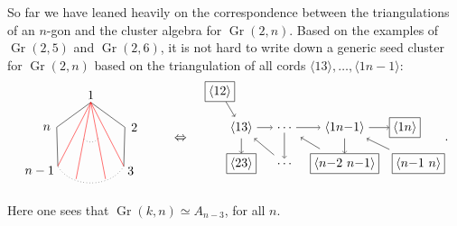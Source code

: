 \documentclass[11pt]{article}
\DeclareMathOperator{\Gr}{Gr}
\def\ket#1{\langle #1 \rangle}
\begin{document}
So far we have leaned heavily on the correspondence between the triangulations of an $n$-gon and the cluster algebra for $\Gr(2,n)$. Based on the examples of $\Gr(2,5)$ and $\Gr(2,6)$, it is not hard to write down a generic seed cluster for $\Gr(2,n)$ based on the triangulation of all cords $\ket{13},\ldots,\ket{1n{-}1}$:
\begin{equation}\label{eq:g2n-seed}
\begin{gathered}
\begin{tikzpicture}
	\coordinate (P1) at (90:1);
	\coordinate (P2) at (18:1);
	\coordinate (P3) at (320:1.2);
	\coordinate (P4) at (220:1.2);
	\coordinate (P5) at (162:1);
	\draw (0,1.2) node {1};
	\draw (1,.3) node[anchor=west] {2};
	\draw (.9,-.9) node[anchor=west] {3};
	\draw (-.9,-.9) node[anchor=east] {$n-1$};
	\draw (-1,.3) node[anchor=east] {$n$};
	\draw (P1) -- (P2) -- (P3);
	\draw[dotted] (P3) to[out=240,in=300] (P4);
	\draw (P4) -- (P5) -- (P1);
	\draw[red] (P1) -- (P3);
	\draw[red] (P1) -- (P4);
	\draw[red] (P1) -- (290:1.2);
	\draw[red] (P1) -- (250:1.2);
	\draw[dotted] (.2,0) to[out=240,in=300] (-.2,0);
	\draw (2.5,0) node {$\Leftrightarrow$};
	\begin{scope}[xshift = .2cm, yshift = .3cm]
	\def \xSep {1.2}
	\def \xInit {4}
    \node (13) at (\xInit,0) {$\ket{13}$};
    \node (14) at (\xInit+\xSep,0) {$\ldots$};
    \node (15) at (\xInit+2.4*\xSep,0) {$\ket{1n{-}1}$};
	\node[draw, inner sep=1mm] (12) at (\xInit-.5*\xSep,1) {$\ket{12}$};
    \node[draw, inner sep=1mm] (16) at (\xInit+3.8*\xSep,0) {$\ket{1n}$};
    \node[draw, inner sep=1mm,anchor=west] (56) at (\xInit+3.5*\xSep,-1) {$\ket{n{-}1~n}$};
    \node[draw, inner sep=1mm] (45) at (\xInit+2.4*\xSep,-1) {$\ket{n{-}2~n{-}1}$};
    \node (34) at (\xInit+\xSep,-1) {$\ldots$};
    \node[draw, inner sep=1mm] (23) at (\xInit,-1) {$\ket{23}$};
    \draw[->] (12) -- (13);
    \draw[->] (13) -- (14);
    \draw[->] (14) -- (15);
    \draw[->] (15) -- (16);
    \draw[->] (13) -- (23);
    \draw[->, shorten <= 0.15cm] (34) -- (13);
    \draw[->] (14) -- (34);
    \draw[->, shorten <= 0.25cm, shorten >= 0.25cm] (45) -- (14);
    \draw[->] (15) -- (45);
    \draw[->, shorten <= 0.25cm] (56) -- (15);
    \end{scope}
\end{tikzpicture}
\end{gathered}.
\end{equation}
Here one sees that $\Gr(k,n) \simeq A_{n-3}$, for all $n$. 
\end{document}

